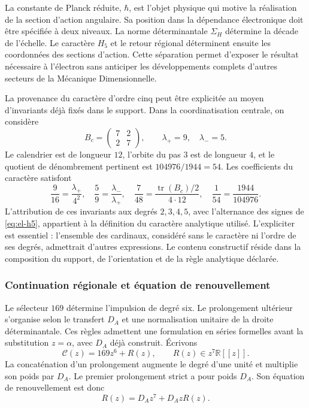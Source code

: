 La constante de Planck réduite, \(\hbar\), est l'objet physique qui
motive la réalisation de la section d'action angulaire. Sa position dans
la dépendance électronique doit être spécifiée à deux niveaux. La norme
déterminantale \(\Sigma_H\) détermine la décade de l'échelle. Le caractère
\(H_5\) et le retour régional déterminent ensuite les coordonnées des
sections d'action. Cette séparation permet d'exposer le résultat
nécessaire à l'électron sans anticiper les développements complets
d'autres secteurs de la Mécanique Dimensionnelle.

La provenance du caractère d'ordre cinq peut être explicitée au moyen
d'invariants déjà fixés dans le support. Dans la coordinatisation centrale, on considère
\[
 B_c=\begin{pmatrix}7&2\\2&7\end{pmatrix},
 \qquad \lambda_+=9,\quad\lambda_-=5.
\]
Le calendrier est de longueur \(12\), l'orbite du pas \(3\) est de
longueur \(4\), et le quotient de dénombrement pertinent est
\(104976/1944=54\). Les coefficients du caractère satisfont
\begin{equation}
 \frac9{16}=\frac{\lambda_+}{4^2},\quad
 \frac59=\frac{\lambda_-}{\lambda_+},\quad
 \frac7{48}=\frac{\operatorname{tr}(B_c)/2}{4\cdot12},\quad
 \frac1{54}=\frac{1944}{104976}.
 \label{eq:revision-h5-coeficientes}
\end{equation}
L'attribution de ces invariants aux degrés \(2,3,4,5\), avec
l'alternance des signes de \eqref{eq:el-h5}, appartient à la définition du
caractère analytique utilisé. L'expliciter est essentiel : l'ensemble des
cardinaux, considéré sans le caractère ni l'ordre de ses degrés,
admettrait d'autres expressions. Le contenu constructif réside dans la
composition du support, de l'orientation et de la règle analytique déclarée.

\subsubsection{Continuation régionale et équation de renouvellement}

Le sélecteur \(169\) détermine l'impulsion de degré six. Le prolongement
ultérieur s'organise selon le transfert \(D_A\) et une normalisation
unitaire de la droite déterminantale. Ces règles admettent une formulation
en séries formelles avant la substitution \(z=\alpha\), avec \(D_A\) déjà
construit. Écrivons
\[
 \mathscr C(z)=169z^6+R(z),\qquad R(z)\in z^7\mathbb R[[z]].
\]
La concaténation d'un prolongement augmente le degré d'une unité et
multiplie son poids par \(D_A\). Le premier prolongement strict a pour
poids \(D_A\). Son équation de renouvellement est donc
\begin{equation}
 R(z)=D_Az^7+D_AzR(z).
 \label{eq:revision-renovacion}
\end{equation}

